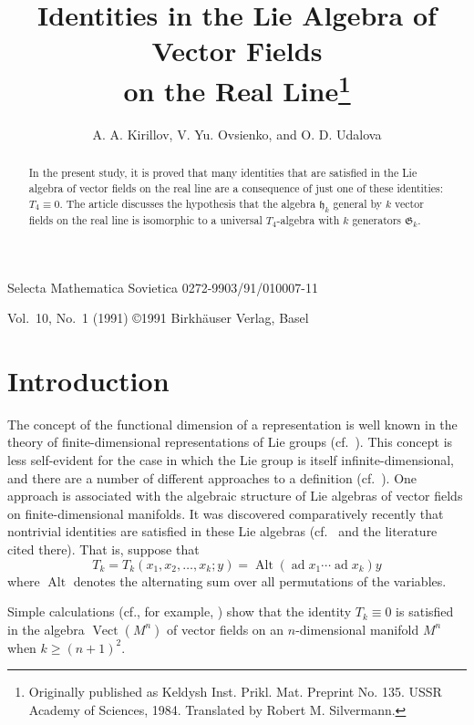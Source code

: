 \documentclass[a4paper]{article}
\title{Identities in the Lie Algebra of Vector Fields \\ on the Real Line\thanks{Originally published as Keldysh Inst. Prikl. Mat. Preprint No. 135. USSR Academy of Sciences, 1984. Translated by Robert M. Silvermann.}}
\date{}
\author{A. A. Kirillov, V. Yu. Ovsienko, and O. D. Udalova}
\newcommand{\ad}{\operatorname{ad}}
\newcommand{\Alt}{\operatorname{Alt}}
\newcommand{\Vect}{\operatorname{Vect}}
\begin{document}
{\small
\noindent
Selecta Mathematica Sovietica   
\hspace{4.2cm}
0272-9903/91/010007-11

\noindent
Vol.\ 10, No.\ 1 (1991)
\hspace{4.5cm}
\copyright 1991 Birkhäuser Verlag, Basel}
	
{\let\newpage\relax\maketitle}
	
\maketitle
	
\begin{abstract}
	In the present study, it is proved that many identities that are satisfied in the Lie algebra of vector fields on the real line are a consequence of just one of these identities: $T_4 \equiv 0$. 
	The article discusses the hypothesis that the algebra $\mathfrak{h}_k$ general by $k$ vector fields on the real line is isomorphic to a universal $T_4$-algebra with $k$ generators $\mathfrak{G}_k$.
\end{abstract}

\section*{Introduction}

The concept of the functional dimension of a representation is well known in the theory of finite-dimensional representations of Lie groups (cf.\  \cite{1,2}).
This concept is less self-evident for the case in which the Lie group is itself infinite-dimensional, and there are a number of different approaches to a definition (cf.\ \cite{3}).
One approach is associated with the algebraic structure of Lie algebras of vector fields on finite-dimensional manifolds.
It was discovered comparatively recently that nontrivial identities are satisfied in these Lie algebras (cf.\ \cite{4} and the literature cited there).
That is, suppose that
\begin{equation}
	\label{eq:1}
	T_k = T_k(x_1,x_2, \dotsc, x_k ; y) = \Alt(\ad x_1 \dotsb \ad x_k) y
\end{equation}
where $\Alt$ denotes the alternating sum over all permutations of the variables.

Simple calculations (cf., for example, \cite{4}) show that the identity $T_k \equiv 0$ is satisfied in the algebra $\Vect(M^n)$ of vector fields on an $n$-dimensional manifold $M^n$ when $k \geq (n+1)^2$.
\end{document}
